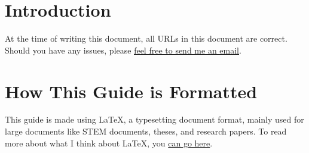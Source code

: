 \section{Introduction}

At the time of writing this document, all URLs in this document are correct. 
Should you have any issues, please 
\underline{\href{mailto:HusseinEsmailContact@gmail.com}
{feel free to send me an email}}.

\section{How This Guide is Formatted}
This guide is made using \LaTeX{}, a typesetting document format, mainly used 
for large documents like STEM documents, theses, and research papers. To read 
more about what I think about \LaTeX{}, you 
\href{https://husseinesmail.xyz/articles/is-latex-better.html}{can go here}.


